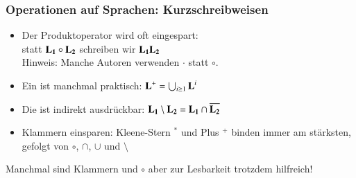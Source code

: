 \documentclass[onlymath]{beamer}
\begin{document}
\begin{frame}\frametitle{Operationen auf Sprachen: Kurzschreibweisen}

\begin{itemize}
\item Der Produktoperator wird oft eingespart:\\ statt $\textbf{\textcolor{black}{L}}_{\textbf{\textcolor{black}{1}}}\circ\textbf{\textcolor{black}{L}}_{\textbf{\textcolor{black}{2}}}$ schreiben wir $\textbf{\textcolor{black}{L}}_{\textbf{\textcolor{black}{1}}}\textbf{\textcolor{black}{L}}_{\textbf{\textcolor{black}{2}}}$\\
{\footnotesize\textcolor{devilscss}{Hinweis: Manche Autoren verwenden $\cdot$ statt $\circ$.}}
%
\item Ein  ist manchmal praktisch: $\textbf{\textcolor{black}{L}}^+= \bigcup_{i\geq 1} \textbf{\textcolor{black}{L}}^i$
%
\item Die  ist indirekt ausdrückbar: $\textbf{\textcolor{black}{L}}_{\textbf{\textcolor{black}{1}}}\setminus\textbf{\textcolor{black}{L}}_{\textbf{\textcolor{black}{2}}} = \textbf{\textcolor{black}{L}}_{\textbf{\textcolor{black}{1}}}\cap\overline{\textbf{\textcolor{black}{L}}_{\textbf{\textcolor{black}{2}}}}$
%
\item Klammern einsparen: Kleene-Stern $^*$ und Plus $^+$ binden immer am stärksten, gefolgt von $\circ$, $\cap$, $\cup$ und $\setminus$
\end{itemize}

{\footnotesize Manchmal sind Klammern und $\circ$ aber zur Lesbarkeit trotzdem hilfreich!}
\bigskip
\pause

\end{frame}
\end{document}
